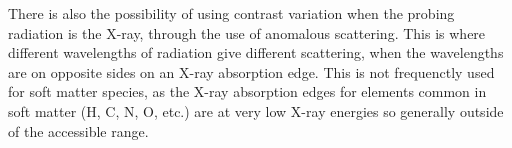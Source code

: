 There is also the possibility of using contrast variation when the probing radiation is the X-ray, through the use of anomalous scattering. This is where different wavelengths of radiation give different scattering, when the wavelengths are on opposite sides on an X-ray absorption edge. This is not frequenctly used for soft matter species, as the X-ray absorption edges for elements common in soft matter (H, C, N, O, etc.) are at very low X-ray energies so generally outside of the accessible range. \cite{Schurtenberger2002}
